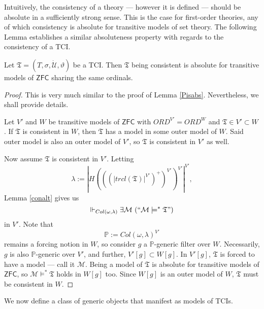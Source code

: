 \documentclass[12pt]{article}
\numberwithin{equation}{section}
\begin{document}
Intuitively, the consistency of a theory --- however it is defined --- should be absolute in a sufficiently strong sense. This is the case for first-order theories, any of which consistency is absolute for transitive models of set theory. The following Lemma establishes a similar absoluteness property with regards to the consistency of a TCI.

\begin{lem}
Let $\mathfrak{T} = (T, \sigma, \dot{\mathcal{U}}, \vartheta)$ be a TCI. Then $\mathfrak{T}$ being consistent is absolute for transitive models of $\mathsf{ZFC}$ sharing the same ordinals.
\end{lem}

\begin{proof}
This is very much similar to the proof of Lemma \ref{Pisabs}. Nevertheless, we shall provide details. 

Let $V'$ and $W$ be transitive models of $\mathsf{ZFC}$ with $ORD^{V'} = ORD^W$ and $\mathfrak{T} \in V' \subset W$. If $\mathfrak{T}$ is consistent in $W$, then $\mathfrak{T}$ has a model in some outer model of $W$. Said outer model is also an outer model of $V'$, so $\mathfrak{T}$ is consistent in $V'$ as well.

Now assume $\mathfrak{T}$ is consistent in $V'$. Letting $$\lambda := |H(((|trcl(\mathfrak{T})|^{V'})^+)^{V'})^{V'}|^{V'},$$ Lemma \ref{conalt} gives us $$\Vdash_{Col(\omega, \lambda)} \exists \mathcal{M} \ (``\mathcal{M} \models^* \mathfrak{T}")$$ in $V'$. Note that $$\mathbb{P} := Col(\omega, \lambda)^{V'}$$ remains a forcing notion in $W$, so consider $g$ a $\mathbb{P}$-generic filter over $W$. Necessarily, $g$ is also $\mathbb{P}$-generic over $V'$, and further, $V'[g] \subset W[g]$. In $V'[g]$, $\mathfrak{T}$ is forced to have a model --- call it $\mathcal{M}$. Being a model of $\mathfrak{T}$ is absolute for transitive models of $\mathsf{ZFC}$, so $\mathcal{M} \models^* \mathfrak{T}$ holds in $W[g]$ too. Since $W[g]$ is an outer model of $W$, $\mathfrak{T}$ must be consistent in $W$.
\end{proof}

We now define a class of generic objects that manifest as models of TCIs.
\end{document}

